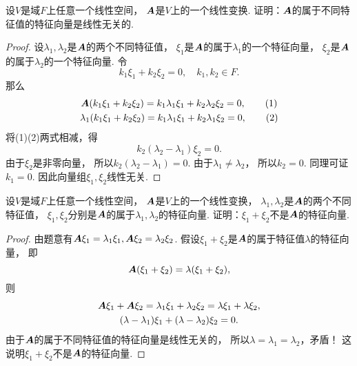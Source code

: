 \begin{example}
设\(V\)是域\(F\)上任意一个线性空间，
\(\boldsymbol{A}\)是\(V\)上的一个线性变换.
证明：\(\boldsymbol{A}\)的属于不同特征值的特征向量是线性无关的.
\begin{proof}
设\(\lambda_1,\lambda_2\)是\(\boldsymbol{A}\)的两个不同特征值，
\(\xi_1\)是\(\boldsymbol{A}\)的属于\(\lambda_1\)的一个特征向量，
\(\xi_2\)是\(\boldsymbol{A}\)的属于\(\lambda_2\)的一个特征向量.
令\begin{equation*}
	k_1 \xi_1 + k_2 \xi_2 = 0,
	\quad k_1,k_2 \in F.
\end{equation*}
那么\begin{gather*}
	\vb{A}(k_1 \xi_1 + k_2 \xi_2)
	= k_1 \lambda_1 \xi_1 + k_2 \lambda_2 \xi_2
	= 0, \tag1 \\
	\lambda_1(k_1 \xi_1 + k_2 \xi_2)
	= k_1 \lambda_1 \xi_1 + k_2 \lambda_1 \xi_2
	= 0, \tag2
\end{gather*}
将(1)(2)两式相减，得\begin{equation*}
	k_2 (\lambda_2 - \lambda_1) \xi_2 = 0.
\end{equation*}
由于\(\xi_2\)是非零向量，
所以\(k_2 (\lambda_2 - \lambda_1) = 0\).
由于\(\lambda_1 \neq \lambda_2\)，
所以\(k_2 = 0\).
同理可证\(k_1 = 0\).
因此向量组\(\xi_1,\xi_2\)线性无关.
\end{proof}
\end{example}

\begin{example}
设\(V\)是域\(F\)上任意一个线性空间，
\(\boldsymbol{A}\)是\(V\)上的一个线性变换，
\(\lambda_1,\lambda_2\)是\(\boldsymbol{A}\)的两个不同特征值，
\(\xi_1,\xi_2\)分别是\(\boldsymbol{A}\)的属于\(\lambda_1,\lambda_2\)的特征向量.
证明：\(\xi_1+\xi_2\)不是\(\boldsymbol{A}\)的特征向量.
\begin{proof}
由题意有\(\boldsymbol{A} \xi_1 = \lambda_1 \xi_1,
\boldsymbol{A} \xi_2 = \lambda_2 \xi_2\).
假设\(\xi_1+\xi_2\)是\(\boldsymbol{A}\)的属于特征值\(\lambda\)的特征向量，
即\begin{equation*}
	\boldsymbol{A} (\xi_1 + \xi_2) = \lambda (\xi_1 + \xi_2),
\end{equation*}
则\begin{gather*}
	\boldsymbol{A} \xi_1 + \boldsymbol{A} \xi_2
	= \lambda_1 \xi_1 + \lambda_2 \xi_2
	= \lambda \xi_1 + \lambda \xi_2, \\
	(\lambda - \lambda_1) \xi_1 + (\lambda - \lambda_2) \xi_2
	= 0.
\end{gather*}
由于\(\boldsymbol{A}\)的属于不同特征值的特征向量是线性无关的，
所以\(\lambda = \lambda_1 = \lambda_2\)，矛盾！
这说明\(\xi_1+\xi_2\)不是\(\boldsymbol{A}\)的特征向量.
\end{proof}
\end{example}

